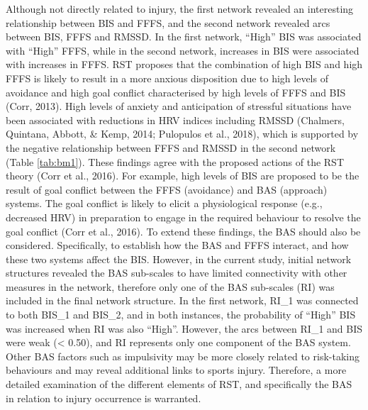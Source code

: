\documentclass[man,floatsintext]{apa6}
\begin{document}
Although not directly related to injury, the first network revealed an interesting relationship between BIS and FFFS, and the second network revealed arcs between BIS, FFFS and RMSSD.
In the first network, \enquote{High} BIS was associated with \enquote{High} FFFS, while in the second network, increases in BIS were associated with increases in FFFS.
RST proposes that the combination of high BIS and high FFFS is likely to result in a more anxious disposition due to high levels of avoidance and high goal conflict characterised by high levels of FFFS and BIS (Corr, 2013).
High levels of anxiety and anticipation of stressful situations have been associated with reductions in HRV indices including RMSSD (Chalmers, Quintana, Abbott, \& Kemp, 2014; Pulopulos et al., 2018), which is supported by the negative relationship between FFFS and RMSSD in the second network (Table \ref{tab:bm1}).
These findings agree with the proposed actions of the RST theory (Corr et al., 2016).
For example, high levels of BIS are proposed to be the result of goal conflict between the FFFS (avoidance) and BAS (approach) systems.
The goal conflict is likely to elicit a physiological response (e.g., decreased HRV) in preparation to engage in the required behaviour to resolve the goal conflict (Corr et al., 2016).
To extend these findings, the BAS should also be considered.
Specifically, to establish how the BAS and FFFS interact, and how these two systems affect the BIS.
However, in the current study, initial network structures revealed the BAS sub-scales to have limited connectivity with other measures in the network, therefore only one of the BAS sub-scales (RI) was included in the final network structure.
In the first network, RI\_1 was connected to both BIS\_1 and BIS\_2, and in both instances, the probability of \enquote{High} BIS was increased when RI was also \enquote{High}.
However, the arcs between RI\_1 and BIS were weak (\textless{} 0.50), and RI represents only one component of the BAS system.
Other BAS factors such as impulsivity may be more closely related to risk-taking behaviours and may reveal additional links to sports injury.
Therefore, a more detailed examination of the different elements of RST, and specifically the BAS in relation to injury occurrence is warranted.
\end{document}
